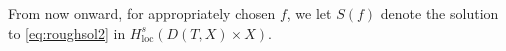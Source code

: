 \documentclass[
	fontsize=11pt, 
	twoside=false, 
	abstract=true, 
	a4paper,
]{scrartcl}
\newcommand{\RR}{\mathbb{R}}
\newcommand{\dd}{\mathrm{d}}
\newcommand{\del}{\partial}
\newcommand{\supp}{\mathrm{supp}}
\begin{document}
\begin{lemma}
	From now onward, for appropriately chosen $f$, we let ${S}(f)$ denote the solution to \cref{eq:roughsol2} in $H^s_{\mathrm{loc}}(D(T,X)\times X)$.%
\end{lemma}
\end{document}
